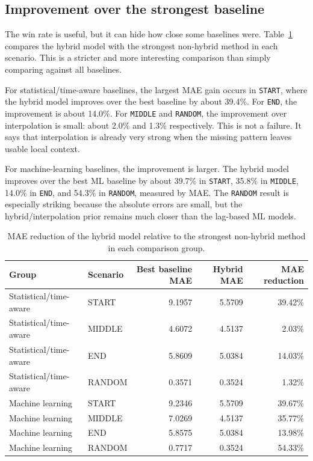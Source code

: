 \subsection{Improvement over the strongest baseline}

The win rate is useful, but it can hide how close some baselines were. Table~\ref{tab:best-baseline-improvement} compares the hybrid model with the strongest non-hybrid method in each scenario. This is a stricter and more interesting comparison than simply comparing against all baselines.

For statistical/time-aware baselines, the largest MAE gain occurs in \texttt{START}, where the hybrid model improves over the best baseline by about 39.4\%. For \texttt{END}, the improvement is about 14.0\%. For \texttt{MIDDLE} and \texttt{RANDOM}, the improvement over interpolation is small: about 2.0\% and 1.3\% respectively. This is not a failure. It says that interpolation is already very strong when the missing pattern leaves usable local context.

For machine-learning baselines, the improvement is larger. The hybrid model improves over the best ML baseline by about 39.7\% in \texttt{START}, 35.8\% in \texttt{MIDDLE}, 14.0\% in \texttt{END}, and 54.3\% in \texttt{RANDOM}, measured by MAE. The \texttt{RANDOM} result is especially striking because the absolute errors are small, but the hybrid/interpolation prior remains much closer than the lag-based ML models.

\begin{table}[ht]
	\centering
	\small
	\begin{tabular}{llrrr}
		\toprule
		\textbf{Group} & \textbf{Scenario} & \textbf{Best baseline MAE} & \textbf{Hybrid MAE} & \textbf{MAE reduction} \\
		\midrule
		Statistical/time-aware & START & 9.1957 & 5.5709 & 39.42\% \\
		Statistical/time-aware & MIDDLE & 4.6072 & 4.5137 & 2.03\% \\
		Statistical/time-aware & END & 5.8609 & 5.0384 & 14.03\% \\
		Statistical/time-aware & RANDOM & 0.3571 & 0.3524 & 1.32\% \\
		Machine learning & START & 9.2346 & 5.5709 & 39.67\% \\
		Machine learning & MIDDLE & 7.0269 & 4.5137 & 35.77\% \\
		Machine learning & END & 5.8575 & 5.0384 & 13.98\% \\
		Machine learning & RANDOM & 0.7717 & 0.3524 & 54.33\% \\
		\bottomrule
	\end{tabular}
	\caption{MAE reduction of the hybrid model relative to the strongest non-hybrid method in each comparison group.}
	\label{tab:best-baseline-improvement}
\end{table}

